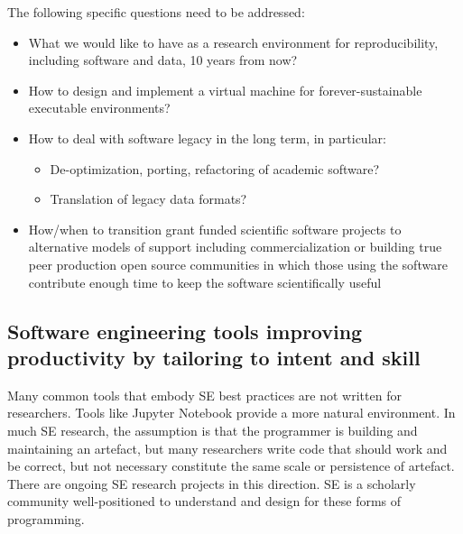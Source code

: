 \documentclass[a4paper,UKenglish]{dagman}
\begin{document}
The following specific questions need to be addressed:

\begin{itemize}
\item What we would like to have as a research environment for reproducibility, including  software and data, 10 years from now?
\item How to design and implement a virtual machine for forever-sustainable executable environments?
\item How to deal with software legacy in the long term, in particular:
    \begin{itemize}
    \item De-optimization, porting, refactoring of academic software?
    \item Translation of legacy data formats?
    \end{itemize}
\item How/when to transition grant funded scientific software projects to alternative models of support including commercialization or building true peer production open source communities in which those using the software contribute enough time to keep the software scientifically useful~\cite{howison2015understanding,howison_sustaining_2015,bietz_sustaining_2012,sustaining-research-projects}
\end{itemize}





\subsection{Software engineering tools improving productivity by tailoring to intent and skill}

Many common tools that embody SE best practices are not written for researchers. Tools like Jupyter Notebook provide a more natural environment. In much SE research, the assumption is that the programmer is building and maintaining an artefact, but many researchers write code that should work and be correct, but not necessary constitute the same scale or persistence of artefact. There are ongoing SE research projects in this direction. SE is a scholarly community well-positioned to understand and design for these forms of programming.
\end{document}
